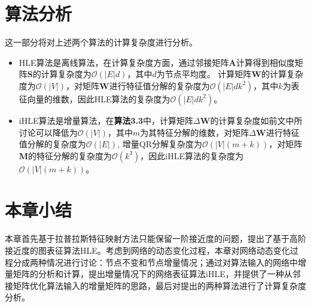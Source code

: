 \section{算法分析}
这一部分将对上述两个算法的计算复杂度进行分析。
\begin{itemize}
	\item HLE算法是离线算法，在计算复杂度方面，通过邻接矩阵\textbf{A}计算得到相似度矩阵\textbf{S}的计算复杂度为$\mathcal{O}(|E|d)$，其中$d$为节点平均度。 计算矩阵\textbf{W}的计算复杂度为$\mathcal{O}(|V|)$，对矩阵$\textbf{W}$进行特征值分解的复杂度为$\mathcal{O}(|E|dk^2)$，其中$k$为表征向量的维数，因此HLE算法的复杂度为$\mathcal{O}(|E|dk^2)$。
	\item
	iHLE算法是增量算法，在\textbf{算法3.3}中，计算矩阵$\Delta\textbf{W}$的计算复杂度如前文中所讨论可以降低为$\mathcal{O}(|V|)$，其中$m$为其特征分解的维数，对矩阵$\Delta\textbf{W}$进行特征值分解的复杂度为$\mathcal{O}(|E|)$, 增量QR分解复杂度为$\mathcal{O}(|V|(m+k))$，对矩阵\textbf{M}的特征分解的复杂度为$\mathcal{O}(k^3)$，因此iHLE算法的复杂度为$\mathcal{O}(|V|(m+k))$。
\end{itemize}

\section{本章小结}
本章首先基于拉普拉斯特征映射方法只能保留一阶接近度的问题，提出了基于高阶接近度的图表征算法HLE。考虑到网络的动态变化过程，本章对网络动态变化过程分成两种情况进行讨论：节点不变和节点增量情况；通过对算法输入的网络中增量矩阵的分析和计算，提出增量情况下的网络表征算法iHLE，并提供了一种从邻接矩阵优化算法输入的增量矩阵的思路，最后对提出的两种算法进行了计算复杂度分析。

